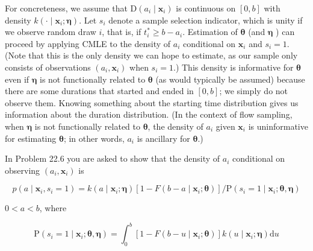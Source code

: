 \documentclass[10pt]{article}
\begin{document}
For concreteness, we assume that $\mathrm{D}\left(a_{i} \mid \mathbf{x}_{i}\right)$ is continuous on $[0, b]$ with density $k\left(\cdot \mid \mathbf{x}_{i} ; \boldsymbol{\eta}\right)$. Let $s_{i}$ denote a sample selection indicator, which is unity if we observe random draw $i$, that is, if $t_{i}^{*} \geq b-a_{i}$. Estimation of $\boldsymbol{\theta}$ (and $\boldsymbol{\eta}$ ) can proceed by applying CMLE to the density of $a_{i}$ conditional on $\mathbf{x}_{i}$ and $s_{i}=1$. (Note that this is the only density we can hope to estimate, as our sample only consists of observations $\left(a_{i}, \mathbf{x}_{i}\right)$ when $s_{i}=1$.) This density is informative for $\boldsymbol{\theta}$ even if $\boldsymbol{\eta}$ is not functionally related to $\boldsymbol{\theta}$ (as would typically be assumed) because there are some durations that started and ended in $[0, b]$; we simply do not observe them. Knowing something about the starting time distribution gives us information about the duration distribution. (In the context of flow sampling, when $\boldsymbol{\eta}$ is not functionally related to $\boldsymbol{\theta}$, the density of $a_{i}$ given $\mathbf{x}_{i}$ is uninformative for estimating $\boldsymbol{\theta}$; in other words, $a_{i}$ is ancillary for $\boldsymbol{\theta}$.)

In Problem 22.6 you are asked to show that the density of $a_{i}$ conditional on observing $\left(a_{i}, \mathbf{x}_{i}\right)$ is


\begin{equation*}
p\left(a \mid \mathbf{x}_{i}, s_{i}=1\right)=k\left(a \mid \mathbf{x}_{i} ; \boldsymbol{\eta}\right)\left[1-F\left(b-a \mid \mathbf{x}_{i} ; \boldsymbol{\theta}\right)\right] / \mathrm{P}\left(s_{i}=1 \mid \mathbf{x}_{i} ; \boldsymbol{\theta}, \boldsymbol{\eta}\right) \tag{22.31}
\end{equation*}


$0<a<b$, where


\begin{equation*}
\mathrm{P}\left(s_{i}=1 \mid \mathbf{x}_{i} ; \boldsymbol{\theta}, \boldsymbol{\eta}\right)=\int_{0}^{b}\left[1-F\left(b-u \mid \mathbf{x}_{i} ; \boldsymbol{\theta}\right)\right] k\left(u \mid \mathbf{x}_{i} ; \boldsymbol{\eta}\right) \mathrm{d} u \tag{22.32}
\end{equation*}
\end{document}
